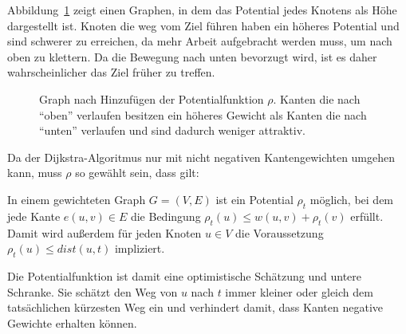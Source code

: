 Abbildung~\ref{fig:astar} zeigt einen Graphen, in dem das Potential jedes Knotens als Höhe
dargestellt ist. Knoten die weg vom Ziel führen haben ein höheres Potential und sind schwerer zu
erreichen, da mehr Arbeit aufgebracht werden muss, um nach oben zu klettern. Da die Bewegung nach
unten bevorzugt wird, ist es daher wahrscheinlicher das Ziel früher zu treffen.

\begin{figure}[h]
    \centering
    
    \caption{Graph nach Hinzufügen der Potentialfunktion $\rho$. Kanten die nach "`oben"' verlaufen
        besitzen ein höheres Gewicht als Kanten die nach "`unten"' verlaufen und sind dadurch
        weniger attraktiv.}
    \label{fig:astar}
\end{figure}

Da der Dijkstra-Algoritmus nur mit nicht negativen Kantengewichten umgehen kann, muss $\rho$ so
gewählt sein, dass gilt:
\begin{definition}
    In einem gewichteten Graph $G=(V,E)$ ist ein Potential $\rho_t$ möglich, bei dem jede Kante
    $e(u,v) \in E$ die Bedingung $\rho_t (u) \le w(u,v) + \rho_t (v)$ erfüllt. Damit wird außerdem
    für jeden Knoten $u \in V$ die Voraussetzung ${\rho_t (u) \le dist(u,t)}$ impliziert.
\end{definition}
Die Potentialfunktion ist damit eine optimistische Schätzung und untere Schranke. Sie schätzt den
Weg von $u$ nach $t$ immer kleiner oder gleich dem tatsächlichen kürzesten Weg ein und verhindert
damit, dass Kanten negative Gewichte erhalten können.

